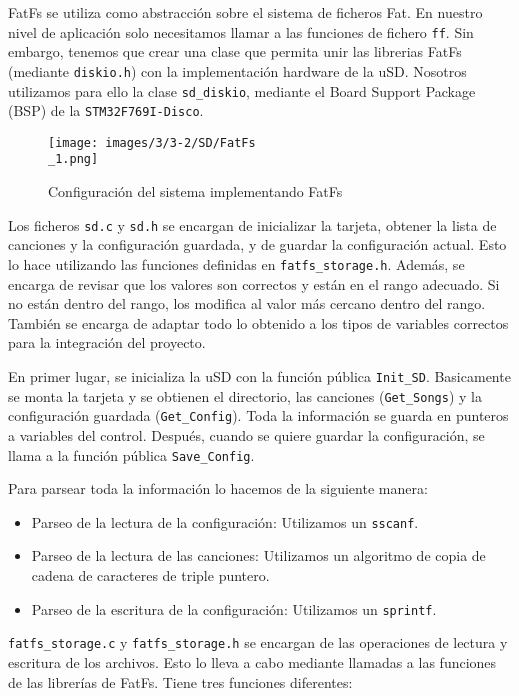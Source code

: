 FatFs se utiliza como abstracción sobre el sistema de ficheros Fat. En nuestro nivel de aplicación solo necesitamos llamar a las funciones de fichero \texttt{ff}. Sin embargo, tenemos que crear una clase que permita unir las librerias FatFs (mediante \texttt{diskio.h}) con la implementación hardware de la uSD. Nosotros utilizamos para ello la clase \texttt{sd\_diskio}, mediante el Board Support Package (BSP) de la \texttt{STM32F769I-Disco}.

\begin{figure}[h]
    \centering
    \texttt{[image: images/3/3-2/SD/FatFs\\\_1.png]}
    \caption{Configuración del sistema implementando FatFs}
    \label{fig:sistema-fatfs}
\end{figure}

Los ficheros \texttt{sd.c} y \texttt{sd.h} se encargan de inicializar la tarjeta, obtener la lista de canciones y la configuración guardada, y de guardar la configuración actual. Esto lo hace utilizando las funciones definidas en \texttt{fatfs\_storage.h}. Además, se encarga de revisar que los valores son correctos y están en el rango adecuado. Si no están dentro del rango, los modifica al valor más cercano dentro del rango. También se encarga de adaptar todo lo obtenido a los tipos de variables correctos para la integración del proyecto.

En primer lugar, se inicializa la uSD con la función pública \texttt{Init\_SD}. Basicamente se monta la tarjeta y se obtienen el directorio, las canciones (\texttt{Get\_Songs}) y la configuración guardada (\texttt{Get\_Config}). Toda la información se guarda en punteros a variables del control. Después, cuando se quiere guardar la configuración, se llama a la función pública \texttt{Save\_Config}.

Para parsear toda la información lo hacemos de la siguiente manera:

\begin{itemize}
	\item Parseo de la lectura de la configuración: Utilizamos un \texttt{sscanf}.
	\item Parseo de la lectura de las canciones: Utilizamos un algoritmo de copia de cadena de caracteres de triple puntero.
	\item Parseo de la escritura de la configuración: Utilizamos un \texttt{sprintf}.
\end{itemize}

\texttt{fatfs\_storage.c} y \texttt{fatfs\_storage.h} se encargan de las operaciones de lectura y escritura de los archivos. Esto lo lleva a cabo mediante llamadas a las funciones de las librerías de FatFs. Tiene tres funciones diferentes:

